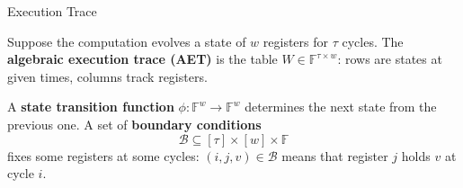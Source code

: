 \documentclass{zkdl-presentation-template}
\begin{document}
    \begin{frame}{Execution Trace}
        \begin{definition}
            Suppose the computation evolves a state of $w$ registers for $\tau$ cycles. The \textbf{algebraic execution trace (AET)} is the table $W \in \mathbb{F}^{\tau \times w}$: rows are states at given times, columns track registers.
        \end{definition}
        \pause

        \begin{definition}
            A \textbf{state transition function} $\phi: \mathbb{F}^{w} \to \mathbb{F}^{w}$ determines the next state from the previous one. A set of \textbf{boundary conditions}
            \begin{equation*}
                \mathcal{B} \subseteq [\tau] \times [w] \times \mathbb{F}
            \end{equation*}
            fixes some registers at some cycles: $(i, j, v) \in \mathcal{B}$ means that register $j$ holds $v$ at cycle $i$.
        \end{definition}
    \end{frame}
\end{document}
